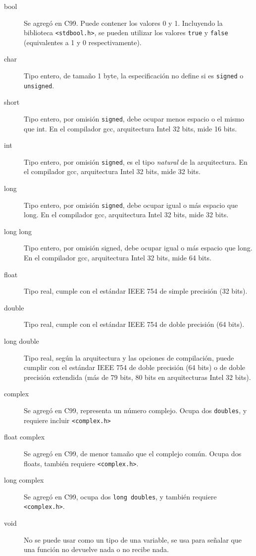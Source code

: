 \begin{description}
\item[bool]
 Se agregó en C99. Puede contener los valores 0 y 1. Incluyendo la biblioteca
\lstinline!<stdbool.h>!, se pueden utilizar los valores \lstinline!true! y
\lstinline!false! (equivalentes a 1 y 0 respectivamente).

\item[char]
 Tipo entero, de tamaño 1 byte, la especificación no define si es \lstinline!signed! o \lstinline!unsigned!.
\item[short]
 Tipo entero, por omisión \lstinline!signed!, debe ocupar menos espacio o el
mismo que int. En el compilador gcc, arquitectura Intel 32 bits, mide 16 bits.

\item[int]
 Tipo entero, por omisión \lstinline!signed!, es el tipo \textit{natural} de la
 arquitectura. En el compilador gcc, arquitectura Intel 32 bits, mide 32 bits.

\item[long]
 Tipo entero, por omisión \lstinline!signed!, debe ocupar igual o más espacio
que long. En el compilador gcc, arquitectura Intel 32 bits, mide 32 bits.

\item[long long]
 Tipo entero, por omisión signed, debe ocupar igual o más espacio
 que long. En el compilador gcc, arquitectura Intel 32 bits, mide 64 bits.

\item[float]
 Tipo real, cumple con el estándar IEEE 754 de simple precisión (32 bits).

\item[double]
 Tipo real, cumple con el estándar IEEE 754 de doble precisión (64 bits).

\item[long double]
 Tipo real, según la arquitectura y las opciones de compilación, puede cumplir
con el estándar IEEE 754 de doble precisión (64 bits) o de doble precisión
extendida (más de 79 bits, 80 bits en arquitecturas Intel 32 bits).

\item[complex]
 Se agregó en C99, representa un número complejo.  Ocupa dos
\lstinline!doubles!, y requiere incluir \lstinline!<complex.h>!

\item[float complex]
 Se agregó en C99, de menor tamaño que el complejo
común. Ocupa dos floats, también requiere \lstinline!<complex.h>!.

\item[long complex]
 Se agregó en C99, ocupa dos \lstinline!long doubles!, y también requiere
\lstinline!<complex.h>!.

\item[void]
 No se puede usar como un tipo de una variable, se usa
 para señalar que una función no devuelve nada o no recibe nada.
\end{description}

